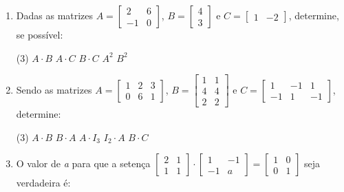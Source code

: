 \begin{enumerate}[label*=\protect\fbox{\arabic{enumi}}]
  \item{ Dadas as matrizes $A = \begin{bmatrix}
    2 & 6 \\
    -1 & 0 
  \end{bmatrix}$, $B = \begin{bmatrix}
    4 \\
    3
  \end{bmatrix}$ e $C = \begin{bmatrix}
    1 & -2
  \end{bmatrix}$, determine, se possível:

  \begin{tasks}(3)
    \task $A \cdot B$
    \task $A \cdot C$
    \task $B \cdot C$
    \task $A^2$
    \task $B^2$
  \end{tasks}
}
\item {
    Sendo as matrizes $A = \begin{bmatrix}
      1 & 2 & 3 \\
      0 & 6 & 1
    \end{bmatrix}$, $B = \begin{bmatrix}
      1 & 1 \\
      4 & 4 \\
      2 & 2 
    \end{bmatrix}$ e $C = \begin{bmatrix}
      1 & -1 & 1 \\
      -1 & 1 & -1
    \end{bmatrix}$, determine:

    \begin{tasks}(3)
      \task $A \cdot B$
      \task $B \cdot A$
      \task $A \cdot I_3$
      \task $I_2 \cdot A$
      \task $B \cdot C$
    \end{tasks}
  }

  \item{
      O valor de \textit{a} para que a setença $\begin{bmatrix}
        2 & 1 \\
        1 & 1
      \end{bmatrix} \cdot  \begin{bmatrix}
        1 & -1 \\
        -1 & a
      \end{bmatrix} = \begin{bmatrix}
        1 & 0 \\
        0 & 1
      \end{bmatrix}$ seja verdadeira é:

}
\end{enumerate}
